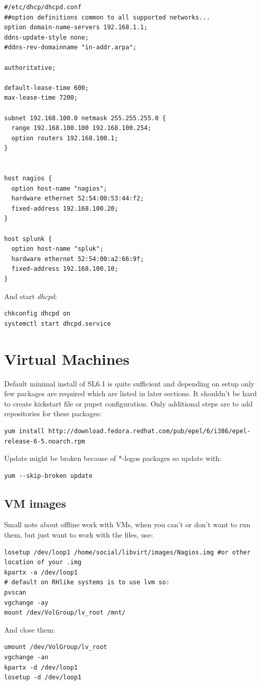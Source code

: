 \documentclass[10pt,a4paper,final]{report}
\begin{document}
\begin{lstlisting}
#/etc/dhcp/dhcpd.conf
##option definitions common to all supported networks...
option domain-name-servers 192.168.1.1;
ddns-update-style none;
#ddns-rev-domainname "in-addr.arpa";

authoritative;

default-lease-time 600;
max-lease-time 7200;

subnet 192.168.100.0 netmask 255.255.255.0 {
  range 192.168.100.100 192.168.100.254;
  option routers 192.168.100.1;
}


host nagios {
  option host-name "nagios";
  hardware ethernet 52:54:00:53:44:f2;
  fixed-address 192.168.100.20;
}

host splunk {
  option host-name "spluk";
  hardware ethernet 52:54:00:a2:66:9f;
  fixed-address 192.168.100.10;
}
\end{lstlisting}
And start \emph{dhcpd}:
\begin{lstlisting}
chkconfig dhcpd on
systemctl start dhcpd.service
\end{lstlisting}

\section{Virtual Machines}
Default minimal install of SL6.1 is quite sufficient and depending on setup only few packages are required which are listed in later sections. It shouldn't be hard to create kickstart file or pupet configuration. Only additional steps are to add repositories for these packages:
\begin{lstlisting}
yum install http://download.fedora.redhat.com/pub/epel/6/i386/epel-release-6-5.noarch.rpm
\end{lstlisting}
Update might be broken because of *-logos packages so update with:
\begin{lstlisting}
yum --skip-broken update
\end{lstlisting}
\subsection{VM images}
Small note about offline work with VMs, when you can't or don't want to run them, but just want to work with the files, use:
\begin{lstlisting}
losetup /dev/loop1 /home/social/libvirt/images/Nagios.img #or other location of your .img
kpartx -a /dev/loop1
# default on RHlike systems is to use lvm so:
pvscan
vgchange -ay
mount /dev/VolGroup/lv_root /mnt/
\end{lstlisting}
And close them:
\begin{lstlisting}
umount /dev/VolGroup/lv_root
vgchange -an
kpartx -d /dev/loop1
losetup -d /dev/loop1
\end{lstlisting}
\end{document}
